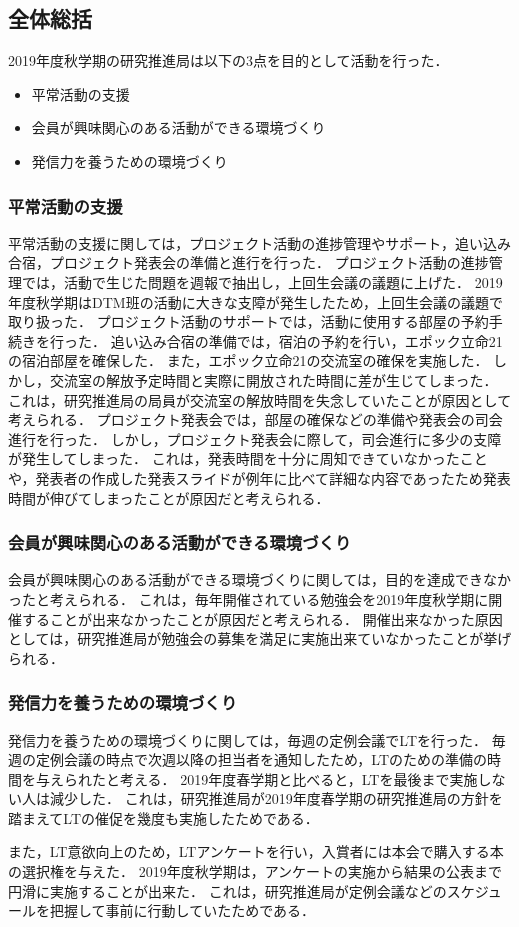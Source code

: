 \subsection*{全体総括}

2019年度秋学期の研究推進局は以下の3点を目的として活動を行った．
\begin{itemize}
\item 平常活動の支援
\item 会員が興味関心のある活動ができる環境づくり
\item 発信力を養うための環境づくり
\end{itemize}

\subsubsection*{平常活動の支援}
平常活動の支援に関しては，プロジェクト活動の進捗管理やサポート，追い込み合宿，プロジェクト発表会の準備と進行を行った．
プロジェクト活動の進捗管理では，活動で生じた問題を週報で抽出し，上回生会議の議題に上げた．
2019年度秋学期はDTM班の活動に大きな支障が発生したため，上回生会議の議題で取り扱った．
プロジェクト活動のサポートでは，活動に使用する部屋の予約手続きを行った．
追い込み合宿の準備では，宿泊の予約を行い，エポック立命21の宿泊部屋を確保した．
また，エポック立命21の交流室の確保を実施した．
しかし，交流室の解放予定時間と実際に開放された時間に差が生じてしまった．
これは，研究推進局の局員が交流室の解放時間を失念していたことが原因として考えられる．
プロジェクト発表会では，部屋の確保などの準備や発表会の司会進行を行った．
しかし，プロジェクト発表会に際して，司会進行に多少の支障が発生してしまった．
これは，発表時間を十分に周知できていなかったことや，発表者の作成した発表スライドが例年に比べて詳細な内容であったため発表時間が伸びてしまったことが原因だと考えられる．

\subsubsection*{会員が興味関心のある活動ができる環境づくり} 
会員が興味関心のある活動ができる環境づくりに関しては，目的を達成できなかったと考えられる．
これは，毎年開催されている勉強会を2019年度秋学期に開催することが出来なかったことが原因だと考えられる．
開催出来なかった原因としては，研究推進局が勉強会の募集を満足に実施出来ていなかったことが挙げられる．

\subsubsection*{発信力を養うための環境づくり} 
発信力を養うための環境づくりに関しては，毎週の定例会議でLTを行った．
毎週の定例会議の時点で次週以降の担当者を通知したため，LTのための準備の時間を与えられたと考える．
2019年度春学期と比べると，LTを最後まで実施しない人は減少した．
これは，研究推進局が2019年度春学期の研究推進局の方針を踏まえてLTの催促を幾度も実施したためである．

また，LT意欲向上のため，LTアンケートを行い，入賞者には本会で購入する本の選択権を与えた．
2019年度秋学期は，アンケートの実施から結果の公表まで円滑に実施することが出来た．
これは，研究推進局が定例会議などのスケジュールを把握して事前に行動していたためである．
